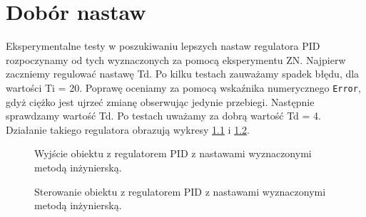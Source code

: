 \chapter{Dobór nastaw}
Eksperymentalne testy w poszukiwaniu lepszych nastaw regulatora PID rozpoczynamy od tych wyznaczonych za pomocą eksperymentu ZN.
Najpierw zaczniemy regulować nastawę Td. Po kilku testach zauważamy spadek błędu, dla wartości Ti = 20. Poprawę oceniamy za pomocą wskaźnika numerycznego \texttt{Error},
gdyż ciężko jest ujrzeć zmianę obserwując jedynie przebiegi. Następnie sprawdzamy wartość Td. Po testach uważamy za dobrą wartość Td = 4. Działanie takiego regulatora
obrazują wykresy \ref{fig:inz_pid_out} i \ref{fig:inz_pid_ster}.

\begin{figure}[tb]
\centering
{}
\caption{Wyjście obiektu z regulatorem PID z nastawami wyznaczonymi metodą inżynierską.}
\label{fig:inz_pid_out}
\end{figure}

\begin{figure}[tb]
\centering
{}
\caption{Sterowanie obiektu z regulatorem PID z nastawami wyznaczonymi metodą inżynierską.}
\label{fig:inz_pid_ster}
\end{figure}
